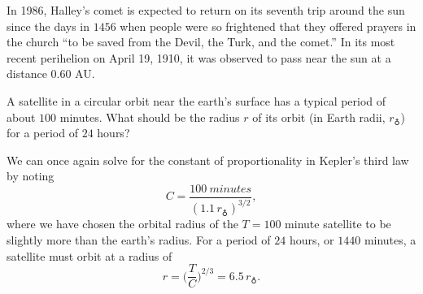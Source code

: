 \documentclass[../feynman-lectures-on-physics.tex]{subfiles}
\begin{document}
\begin{questions}
	\question In 1986, Halley's comet is expected to return on its seventh trip around the sun since the days in $1456$ when people were so frightened that they offered prayers in the church ``to be saved from the Devil, the Turk, and the comet.'' In its most recent perihelion on April 19, 1910, it was observed to pass near the sun at a distance $0.60$ AU.

	\begin{solution}
	\end{solution}

	\question A satellite in a circular orbit near the earth's surface has a typical period of about $100$ minutes. What should be the radius $r$ of its orbit (in Earth radii, $r_{\varEarth}$) for a period of $24$ hours?

	\begin{solution}
		We can once again solve for the constant of proportionality in Kepler's third law by noting
		\[
			C = \frac{\SI{100}{minutes}}{(1.1\,r_{\varEarth})^{3/2}}
		,\] 
		where we have chosen the orbital radius of the $T = 100$ minute satellite to be slightly more than the earth's radius. For a period of $24$ hours, or $1440$ minutes, a satellite must orbit at a radius of
		\[
			r = \Big(\frac{T}{C}\Big)^{2/3} = 6.5\,r_\varEarth
		.\] 
	\end{solution}


\end{questions}
\end{document}
